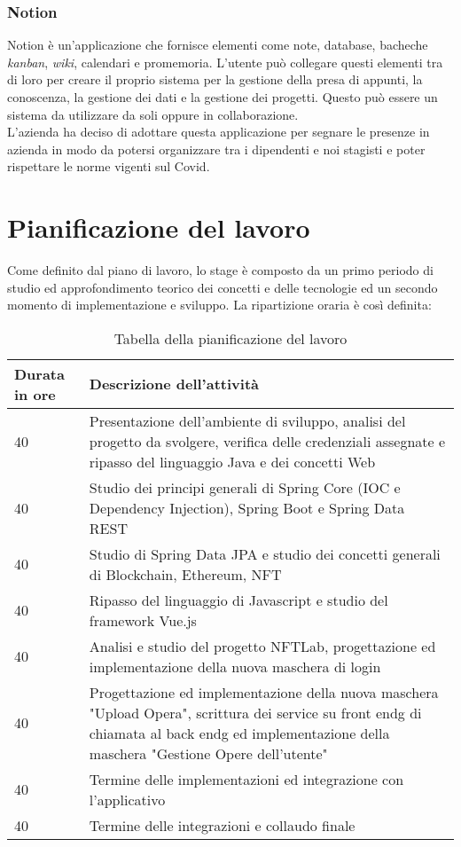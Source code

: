 \subsubsection{Notion}
\label{subsubsec:notion}
Notion è un'applicazione che fornisce elementi come note, database, bacheche \textit{kanban}, \textit{wiki}, calendari e promemoria. L'utente può collegare questi elementi tra di loro per creare il proprio sistema per la gestione della presa di appunti, la conoscenza, la gestione dei dati e la gestione dei progetti. Questo può essere un sistema da utilizzare da soli oppure in collaborazione.\\
L'azienda ha deciso di adottare questa applicazione per segnare le presenze in azienda in modo da potersi organizzare tra i dipendenti e noi stagisti e poter rispettare le norme vigenti sul Covid.

\section{Pianificazione del lavoro}
\label{sec:pianificazione-lavoro}
Come definito dal piano di lavoro, lo stage è composto da un primo periodo di studio ed approfondimento teorico dei concetti e delle tecnologie ed un secondo momento di implementazione e sviluppo. La ripartizione oraria è così definita:
\begin{table}[H]
	\caption{Tabella della pianificazione del lavoro}
	\label{tab:pianificazione-del-lavoro}
	\renewcommand{\arraystretch}{1.6}
	\begin{tabularx}{\textwidth}{lX}
		\hline
		\textbf{Durata in ore} & \textbf{Descrizione dell'attività}\\
		\hline
		40 & Presentazione dell'ambiente di sviluppo, analisi del progetto da svolgere, verifica delle credenziali assegnate e ripasso del linguaggio Java e dei concetti Web\\
		\hline
		40 & Studio dei principi generali di Spring Core (IOC e Dependency Injection), Spring Boot e Spring Data REST \\
		\hline
		40 & Studio di Spring Data JPA e studio dei concetti generali di Blockchain, Ethereum, NFT\\
		\hline
		40 & Ripasso del linguaggio di Javascript e studio del framework Vue.js\\
		\hline
		40 & Analisi e studio del progetto NFTLab, progettazione ed implementazione della nuova maschera di login\\
		\hline
		40 & Progettazione ed implementazione della nuova maschera "Upload Opera", scrittura dei service su \gls{front endg} di chiamata al \gls{back endg} ed implementazione della maschera "Gestione Opere dell'utente"\\
		\hline
		40 & Termine delle implementazioni ed integrazione con l'applicativo\\
		\hline
		40 & Termine delle integrazioni e collaudo finale\\
		\hline
	\end{tabularx}
\end{table}%

